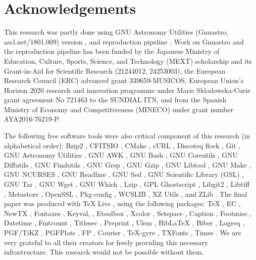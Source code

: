 \documentclass[10pt, twocolumn]{article}
\begin{document}
\section{Acknowledgements}

This research was partly done using GNU Astronomy Utilities (Gnuastro,
ascl.net/1801.009) version \gnuastroversion, and reproduction pipeline
\pipelineversion. Work on Gnuastro and the reproduction pipeline has been
funded by the Japanese Ministry of Education, Culture, Sports, Science, and
Technology (MEXT) scholarship and its Grant-in-Aid for Scientific Research
(21244012, 24253003), the European Research Council (ERC) advanced grant
339659-MUSICOS, European Union’s Horizon 2020 research and innovation
programme under Marie Sklodowska-Curie grant agreement No 721463 to the
SUNDIAL ITN, and from the Spanish Ministry of Economy and Competitiveness
(MINECO) under grant number AYA2016-76219-P.

The following free software tools were also critical component of this
research (in alphabetical order): Bzip2 \bziptwoversion, CFITSIO
\cfitsioversion, CMake \cmakeversion, cURL \curlversion, Discoteq flock
\flockversion, Git \gitversion, GNU Astronomy Utilities \gnuastroversion,
GNU AWK \gawkversion, GNU Bash \bashversion, GNU Coreutils
\coreutilsversion, GNU Diffutils \diffutilsversion, GNU Findutils
\findutilsversion, GNU Grep \grepversion, GNU Gzip \gzipversion, GNU
Libtool \libtoolversion, GNU Make \makeversion, GNU NCURSES
\ncursesversion, GNU Readline \readlineversion, GNU Sed \sedversion, GNU
Scientific Library (GSL) \gslversion, GNU Tar \tarversion, GNU Wget
\wgetversion, GNU Which \whichversion, Lzip \lzipversion, GPL Ghostscript
\ghostscriptversion, Libgit2 \libgitwoversion, Libtiff \libtiffversion,
Metastore \metastoreversion, OpenSSL \opensslversion, Pkg-config
\pkgconfigversion, WCSLIB \wcslibversion, XZ Utils \xzversion, and ZLib
\zlibversion. The final paper was produced with \TeX{} Live
\texliveversion, using the following packages: \TeX{} \textexversion, EC
\texecversion, NewTX \texnewtxversion, Fontaxes \texfontaxesversion,
Keyval, \texxkeyvalversion, Etoolbox \texetoolboxversion, Xcolor
\texxcolorversion, Setspace \texsetspaceversion, Caption
\texcaptionversion, Footmisc \texfootmiscversion, Datetime
\texdatetimeversion, Fmtcount \texfmtcountversion, Titlesec
\textitlesecversion, Preprint \texpreprintversion, Ulem \texulemversion,
Bib\LaTeX{} \texbiblatexversion, Biber \texbiberversion, Logreq
\texlogreqversion, PGF/TiKZ \texpgfversion, PGFPlots \texpgfplotsversion,
FP \texfpversion, Courier \texcourierversion, \TeX-gyre \textexgyreversion,
TXFonts \textxfontsversion, Times \textimesversion. We are very grateful to
all their creators for freely providing this necessary infrastructure. This
research would not be possible without them.

\printbibliography

\end{document}
